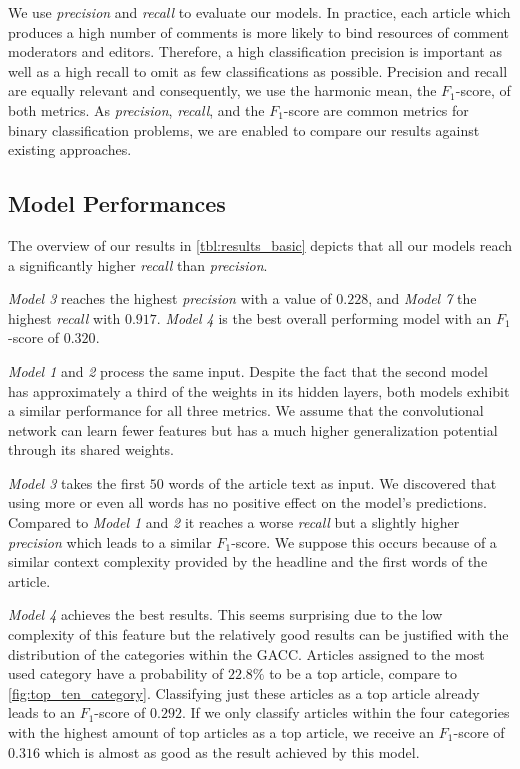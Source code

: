 We use \textit{precision} and \textit{recall} to evaluate our models. 
In practice, each article which produces a high number of comments is more likely to bind resources of comment moderators and editors. 
Therefore, a high classification precision is important as well as a high recall to omit as few classifications as possible.
Precision and recall are equally relevant and consequently, we use the harmonic mean, the $F_1$-score, of both metrics. As \textit{precision}, \textit{recall}, and the $F_1$-score are common metrics for binary classification problems, we are enabled to compare our results against existing approaches.

\subsection{Model Performances}
The overview of our results in \autoref{tbl:results_basic} depicts that all our models reach a significantly higher \textit{recall} than \textit{precision}.

\textit{Model 3} reaches the highest \textit{precision} with a value of $0.228$, and \textit{Model 7} the highest \textit{recall} with $0.917$. \textit{Model 4} is the best overall performing model with an $F_1$-score of $0.320$. 



\textit{Model 1} and \textit{2} process the same input. Despite the fact that the second model has approximately a third of the weights in its hidden layers, both models exhibit a similar performance for all three metrics.
We assume that the convolutional network can learn fewer features but has a much higher generalization potential through its shared weights.

\textit{Model 3} takes the first $50$ words of the article text as input. We discovered that using more or even all words has no positive effect on the model's predictions.
Compared to \textit{Model 1} and \textit{2} it reaches a worse \textit{recall} but a slightly higher \textit{precision} which leads to a similar $F_1$-score.
We suppose this occurs because of a similar context complexity provided by the headline and the first words of the article.

\textit{Model 4} achieves the best results. This seems surprising due to the low complexity of this feature but the relatively good results can be justified with the distribution of the categories within the GACC. 
Articles assigned to the most used category have a probability of $22.8\%$ to be a top article, compare to \autoref{fig:top_ten_category}. Classifying just these articles as a top article already leads to an $F_1$-score of $0.292$. 
If we only classify articles within the four categories with the highest amount of top articles as a top article, we receive an $F_1$-score of $0.316$ which is almost as good as the result achieved by this model.

